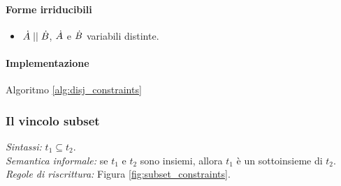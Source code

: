 \documentclass[12pt,a4paper,openright]{book} %
\begin{document}
\paragraph{Forme irriducibili}
\begin{itemize}
	\item $\dot{A} \mid\mid \dot{B}$, $\dot{A}$ e $\dot{B}$ variabili distinte.
\end{itemize}

\paragraph{Implementazione}
Algoritmo \ref{alg:disj_constraints}

\subsubsection{Il vincolo subset}

\textit{Sintassi:} $t_1 \subseteq t_2$.\\
\noindent\textit{Semantica informale:} se $t_1$ e $t_2$ sono insiemi, allora $t_1$ è un sottoinsieme di $t_2$.\\
\noindent\textit{Regole di riscrittura:} Figura \ref{fig:subset_constraints}.
\end{document}
